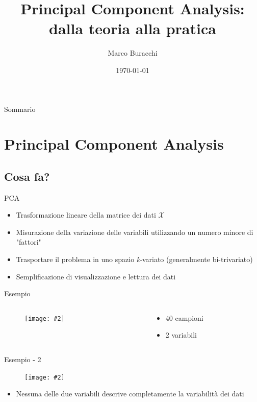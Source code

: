 \documentclass[xcolor={dvipsnames}]{beamer}%
\author{Marco Buracchi}
\title{Principal Component Analysis:\\ dalla teoria alla pratica}
\institute{Università degli studi di Firenze}
\date{\today}
\newcommand{\figcen}[2]{
	\begin{figure}
		\begin{center}
			\texttt{[image: \#2]}
		\end{center}
	\end{figure}
}
\begin{document}
\maketitle

\small

\begin{frame}{Sommario}

  \tableofcontents

\end{frame}

\section{Principal Component Analysis}

	\subsection{Cosa fa?}
	
		\begin{frame}{PCA}
			\begin{itemize}
				\item Trasformazione lineare della matrice dei dati $\mathcal{X}$
				\item Misurazione della variazione delle variabili utilizzando un numero minore di "fattori"
				\item Trasportare il problema in uno spazio \emph{k}-variato (generalmente bi-trivariato)
				\item Semplificazione di visualizzazione e lettura dei dati
			\end{itemize}
		\end{frame}


		\begin{frame}{Esempio}
			\begin{columns}
				\begin{column}{0.5\textwidth}
					\figcen{\columnwidth}{plotTeoria}
				\end{column}
				\begin{column}{0.5\textwidth}
					\begin{itemize}
						\item 40 campioni
						\item 2 variabili
					\end{itemize}
				\end{column}
			\end{columns}			
		\end{frame}
	
		\begin{frame}{Esempio - 2}
			\figcen{.8\textwidth}{proiezione}
			\begin{itemize}
				\item Nessuna delle due variabili descrive completamente la variabilità dei dati
			\end{itemize}
		\end{frame}
	
\end{document}
